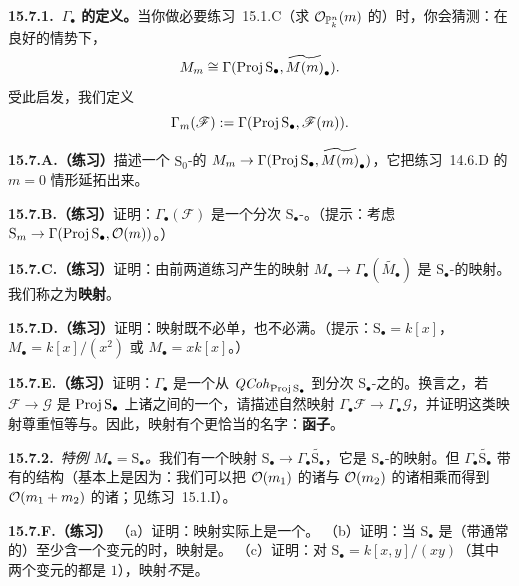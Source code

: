 \textbf{15.7.1.\ $\Gamma_\bullet$ 的定义。}\quad 当你做\mbox{必要练习~15.1.C}（求 $\mathcal{O}_{\mathbb{P}^n_k}(m)$ 的\trGlobalSections）时，你会猜测：在良好的情势下，
\[
M_m\cong\Gamma(\operatorname{Proj} \mathrm{S}_\bullet,\widetilde{M(m)}_\bullet).
\]
受此启发，我们定义
\[
\Gamma_m(\mathscr{F}):=\Gamma(\operatorname{Proj} \mathrm{S}_\bullet,\mathscr{F}(m)).
\]

\textbf{15.7.A.（练习）}\quad 描述一个 $\mathrm{S}_0$-\trModule{}的\trMorphism{} $M_m\to\Gamma(\operatorname{Proj} \mathrm{S}_\bullet,\widetilde{M(m)}_\bullet)$，它把\mbox{练习~14.6.D} 的 $m=0$ 情形延拓出来。

\textbf{15.7.B.（练习）}\quad 证明：$\Gamma_\bullet(\mathscr{F})$ 是一个分次 $\mathrm{S}_\bullet$-\trModule。（提示：考虑 $\mathrm{S}_m\to\Gamma(\operatorname{Proj} \mathrm{S}_\bullet,\mathcal{O}(m))$。）

\textbf{15.7.C.（练习）}\quad 证明：由前两道练习产生的映射 $M_\bullet\to\Gamma_\bullet(\widetilde{M_\bullet})$ 是 $\mathrm{S}_\bullet$-\trModule{}的映射。我们称之为\textbf{\trSaturation{}映射}。

\textbf{15.7.D.（练习）}\quad 证明：\trSaturation{}映射既不必单，也不必满。（提示：$\mathrm{S}_\bullet=k[x]$，$M_\bullet=k[x]/(x^2)$ 或 $M_\bullet=xk[x]$。）

\textbf{15.7.E.（练习）}\quad 证明：$\Gamma_\bullet$ 是一个从 $\mathit{QCoh}_{\operatorname{Proj} \mathrm{S}_\bullet}$ 到分次 $\mathrm{S}_\bullet$-\trModule{}之\trCategory{}的\trFunctor。换言之，若 $\mathscr{F}\to\mathscr{G}$ 是 $\operatorname{Proj} \mathrm{S}_\bullet$ 上诸\trQCSheaf{}之间的一个\trMorphism，请描述自然映射 $\Gamma_\bullet\mathscr{F}\to\Gamma_\bullet\mathscr{G}$，并证明这类映射尊重恒等与\trComposition。因此，\trSaturation{}映射有个更恰当的名字：\textbf{\trSaturation{}函子}。

\textbf{15.7.2.}\ \emph{特例 $M_\bullet=\mathrm{S}_\bullet$。}\quad 我们有一个\trSaturation{}映射 $\mathrm{S}_\bullet\to\Gamma_\bullet\widetilde{\mathrm{S}_\bullet}$，它是 $\mathrm{S}_\bullet$-\trModule{}的映射。但 $\Gamma_\bullet\widetilde{\mathrm{S}_\bullet}$ 带有\trGradedRing{}的结构（基本上是因为：我们可以把 $\mathcal{O}(m_1)$ 的诸\trSection{}与 $\mathcal{O}(m_2)$ 的诸\trSection{}相乘而得到 $\mathcal{O}(m_1+m_2)$ 的诸\trSection；见\mbox{练习~15.1.I}）。

\textbf{15.7.F.（练习）}\quad
（a）证明：\trSaturation{}映射实际上是一个\trRingMorphism。
（b）证明：当 $\mathrm{S}_\bullet$ 是（带通常\trGrading{}的）至少含一个变元的\trPolynomialRing{}时，\trSaturation{}映射是\trIsomorphism。
（c）证明：对 $\mathrm{S}_\bullet=k[x,y]/(xy)$（其中两个变元的\trDegree{}都是 $1$），\trSaturation{}映射\emph{不}是\trIsomorphism。

